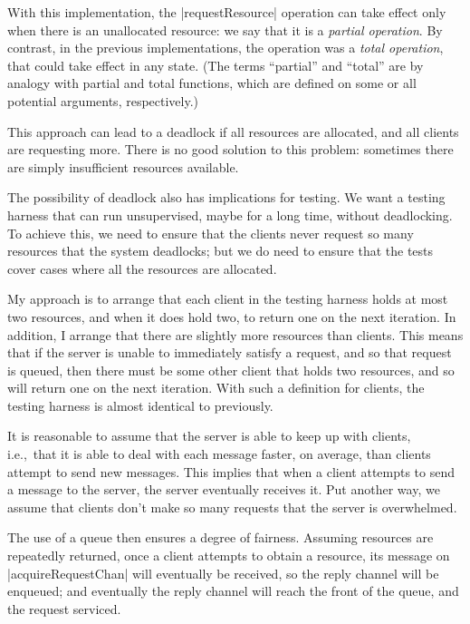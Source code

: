 With this implementation, the |requestResource| operation can take effect only
when there is an unallocated resource: we say that it is a \emph{partial
  operation}.  By contrast, in the previous
implementations, the operation was a \emph{total operation}, that could take effect in any state.  (The terms ``partial'' and
``total'' are by analogy with partial and total functions, which are defined
on some or all potential arguments, respectively.)

This approach can lead to a deadlock if all resources are allocated, and all
clients are requesting more.  There is no good solution to this problem:
sometimes there are simply insufficient resources available.  

The possibility of deadlock also has implications for testing.  We want a
testing harness that can run unsupervised, maybe for a long time, without
deadlocking.  To achieve this, we need to ensure that the clients never
request so many resources that the system deadlocks; but we do need to ensure
that the tests cover cases where all the resources are allocated.

My approach is to arrange that each client in the testing harness holds at
most two resources, and when it does hold two, to return one on the next
iteration.  In addition, I arrange that there are slightly more resources than
clients.  This means that if the server is unable to immediately satisfy a
request, and so that request is queued, then there must be some other client
that holds two resources, and so will return one on the next iteration.  With
such a definition for clients, the testing harness is almost identical to
previously. 

It is reasonable to assume that the server is able to keep up with clients,
i.e.,~that it is able to deal with each message faster, on average, than
clients attempt to send new messages.  This implies that when a client
attempts to send a message to the server, the server eventually receives it.
Put another way, we assume that clients don't make so many requests that the
server is overwhelmed.

The use of a queue then ensures a degree of fairness.
Assuming resources are repeatedly returned, once a client attempts to obtain a
resource, its message on |acquireRequestChan| will eventually be received, so
the reply channel will be enqueued; and eventually the reply channel will
reach the front of the queue, and the request serviced.

